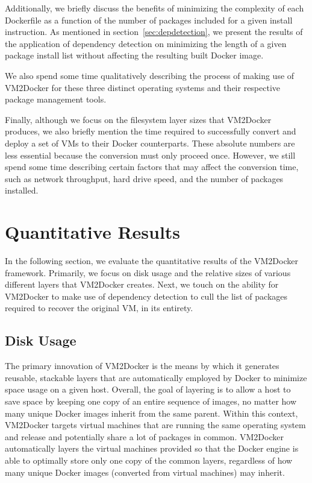 Additionally, we briefly discuss the benefits of minimizing the complexity of each Dockerfile as a function of the number of packages included for a given install instruction. As mentioned in section~\ref{sec:depdetection}, we present the results of the application of dependency detection on minimizing the length of a given package install list without affecting the resulting built Docker image.

We also spend some time qualitatively describing the process of making use of VM2Docker for these three distinct operating systems and their respective package management tools.

Finally, although we focus on the filesystem layer sizes that VM2Docker produces, we also briefly mention the time required to successfully convert and deploy a set of VMs to their Docker counterparts. These absolute numbers are less essential because the conversion must only proceed once. However, we still spend some time describing certain factors that may affect the conversion time, such as network throughput, hard drive speed, and the number of packages installed.



\section{Quantitative Results}
In the following section, we evaluate the quantitative results of the VM2Docker framework. Primarily, we focus on disk usage and the relative sizes of various different layers that VM2Docker creates. Next, we touch on the ability for VM2Docker to make use of dependency detection to cull the list of packages required to recover the original VM, in its entirety.

\subsection{Disk Usage}
The primary innovation of VM2Docker is the means by which it generates reusable, stackable layers that are automatically employed by Docker to minimize space usage on a given host. Overall, the goal of layering is to allow a host to save space by keeping one copy of an entire sequence of images, no matter how many unique Docker images inherit from the same parent. Within this context, VM2Docker targets virtual machines that are running the same operating system and release and potentially share a lot of packages in common. VM2Docker automatically layers the virtual machines provided so that the Docker engine is able to optimally store only one copy of the common layers, regardless of how many unique Docker images (converted from virtual machines) may inherit.

